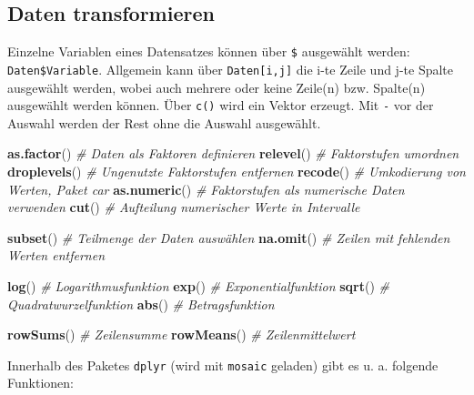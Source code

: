 \documentclass[12pt,ngerman,paper=a4,pagesize,DIV=13]{scrreprt}
\newenvironment{Shaded}{\begin{snugshade}}{\end{snugshade}}
\newcommand{\CommentTok}[1]{\textcolor[rgb]{0.56,0.35,0.01}{\textit{#1}}}
\newcommand{\KeywordTok}[1]{\textcolor[rgb]{0.13,0.29,0.53}{\textbf{#1}}}
\newcommand{\NormalTok}[1]{#1}
\newcommand{\OperatorTok}[1]{\textcolor[rgb]{0.81,0.36,0.00}{\textbf{#1}}}
\newcommand{\StringTok}[1]{\textcolor[rgb]{0.31,0.60,0.02}{#1}}
\begin{document}
\hypertarget{daten-transformieren}{%
\subsection{Daten transformieren}\label{daten-transformieren}}

Einzelne Variablen eines Datensatzes können über \texttt{\$} ausgewählt
werden: \texttt{Daten\$Variable}. Allgemein kann über
\texttt{Daten{[}i,j{]}} die i-te Zeile und j-te Spalte ausgewählt
werden, wobei auch mehrere oder keine Zeile(n) bzw. Spalte(n) ausgewählt
werden können. Über \texttt{c()} wird ein Vektor erzeugt. Mit \texttt{-}
vor der Auswahl werden der Rest ohne die Auswahl ausgewählt.

\begin{Shaded}
\begin{Highlighting}[]
\KeywordTok{as.factor}\NormalTok{() }\CommentTok{# Daten als Faktoren definieren}
\KeywordTok{relevel}\NormalTok{() }\CommentTok{# Faktorstufen umordnen}
\KeywordTok{droplevels}\NormalTok{() }\CommentTok{# Ungenutzte Faktorstufen entfernen}
\KeywordTok{recode}\NormalTok{() }\CommentTok{# Umkodierung von Werten, Paket car}
\KeywordTok{as.numeric}\NormalTok{() }\CommentTok{# Faktorstufen als numerische Daten verwenden}
\KeywordTok{cut}\NormalTok{() }\CommentTok{# Aufteilung numerischer Werte in Intervalle}

\KeywordTok{subset}\NormalTok{() }\CommentTok{# Teilmenge der Daten auswählen}
\KeywordTok{na.omit}\NormalTok{() }\CommentTok{# Zeilen mit fehlenden Werten entfernen}

\KeywordTok{log}\NormalTok{() }\CommentTok{# Logarithmusfunktion}
\KeywordTok{exp}\NormalTok{() }\CommentTok{# Exponentialfunktion}
\KeywordTok{sqrt}\NormalTok{() }\CommentTok{# Quadratwurzelfunktion}
\KeywordTok{abs}\NormalTok{() }\CommentTok{# Betragsfunktion}

\KeywordTok{rowSums}\NormalTok{() }\CommentTok{# Zeilensumme}
\KeywordTok{rowMeans}\NormalTok{() }\CommentTok{# Zeilenmittelwert}
\end{Highlighting}
\end{Shaded}

Innerhalb des Paketes \texttt{dplyr} (wird mit \texttt{mosaic} geladen)
gibt es u. a. folgende Funktionen:

\begin{Shaded}
\end{Shaded}
\end{document}
